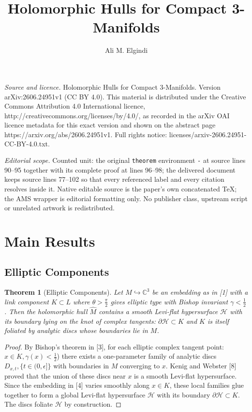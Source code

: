 \documentclass[10pt,a4paper]{amsart}
\newtheorem{theorem}{Theorem}
\newcommand{\hatM}{\widehat{M}}
\begin{document}
\title[Holomorphic Hulls for Compact 3-Manifolds]{Holomorphic Hulls for Compact 3-Manifolds}
\author{Ali M. Elgindi}
\date{}
\maketitle
\noindent\emph{Source and licence.} Holomorphic Hulls for Compact 3-Manifolds. Version arXiv:2606.24951v1 (CC BY 4.0). This material is distributed under the Creative Commons Attribution 4.0 International licence, http://creativecommons.org/licenses/by/4.0/, as recorded in the arXiv OAI licence metadata for this exact version and shown on the abstract page https://arxiv.org/abs/2606.24951v1. Full rights notice: licenses/arxiv-2606.24951-CC-BY-4.0.txt.\par\smallskip
\noindent\textit{Editorial scope.} Counted unit: the original \texttt{theorem} environment \texttt{-} at source lines 90--95 together with its complete proof at lines 96--98; the delivered document keeps source lines 77--102 so that every referenced label and every citation resolves inside it. Native editable source is the paper's own concatenated TeX; the AMS wrapper is editorial formatting only. No publisher class, upstream script or unrelated artwork is redistributed.
\section{Main Results}
\subsection{Elliptic Components}
\begin{theorem}[Elliptic Components] Let $M \hookrightarrow \mathbb{C}^3$ be an embedding as in [1] with a link component $K \subset L$ where $\theta > \frac{\pi}{2}$ gives elliptic type with Bishop invariant $\gamma < \frac{1}{2}$. Then the holomorphic hull $\hatM$ contains a smooth Levi-flat hypersurface $\mathcal{H}$ with its boundary lying on the knot of complex tangents: $\partial\mathcal{H} \subset K$ and $K$ is itself foliated by analytic discs whose boundaries lie in $M$.
\end{theorem}
\begin{proof}
By Bishop's theorem in [3], for each elliptic complex tangent point: $x \in K, \gamma (x)< \frac{1}{2}$) there exists a one-parameter family of analytic discs ${D_{x,t},\{t \in (0,\epsilon]}\}$ with boundaries in $M$ converging to $x$. Kenig and Webster [8] proved that the union of these discs near $x$ is a smooth Levi-flat hypersurface. Since the embedding in [4] varies smoothly along $x \in K$, these local families glue together to form a global Levi-flat hypersurface $\mathcal{H}$ with its boundary $\partial \mathcal{H} \subset K$. The discs foliate $\mathcal{H}$ by construction.
\end{proof}
\end{document}
